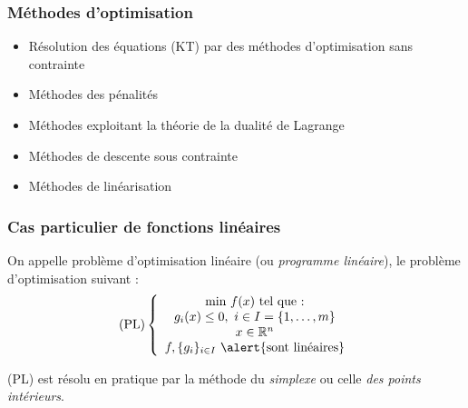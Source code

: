 \documentclass{beamer}
\newcommand{\R}{{\ensuremath\mathbb{R}}}
\begin{document}
\begin{frame}
  \frametitle{Méthodes d'optimisation}

  \begin{itemize}
  \item Résolution des équations (KT) par des méthodes d'optimisation sans contrainte
  \item Méthodes des pénalités
  \item Méthodes exploitant la théorie de la dualité de Lagrange
  \item Méthodes de descente sous contrainte
  \item Méthodes de linéarisation
  \end{itemize}
  
\end{frame}

\begin{frame}
  \frametitle{Cas particulier de fonctions linéaires}

  On appelle problème d'optimisation linéaire (ou \emph{programme linéaire}),
  le problème d'optimisation suivant : 
  \[
  \text{(PL)} \left\{
  \begin{array}{c}
    \text{min} \ f(x) \ \text{tel que :} \\
    g_i(x) \leq 0, \ i \in I = \{1, \dots, m\} \\
    x \in \R^n \\
    f, \{g_i\}_{i \in I} \ \alert{\text{sont linéaires}} \\
  \end{array}
  \right.
  \]

  (PL) est résolu en pratique par la méthode du \emph{simplexe}
  ou celle \emph{des points intérieurs}.
\end{frame}
\end{document}
